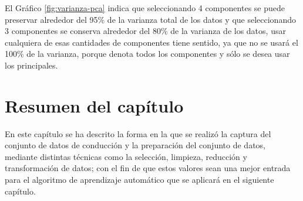 El Gr\'{a}fico \ref{fig:varianza-pca} indica que seleccionando 4 componentes se puede preservar alrededor del 95\% de la varianza total de los datos y que seleccionando 3 componentes se conserva alrededor del 80\% de la varianza de los datos, usar cualquiera de esas cantidades de componentes tiene sentido, ya que no se usar\'{a} el 100\% de la varianza, porque denota todos los componentes y s\'{o}lo se desea usar los principales.


\vspace{5mm} %

\section{Resumen del cap\'{i}tulo}

En este cap\'{i}tulo se ha descrito la forma en la que se realiz\'{o} la captura del conjunto de datos de conducci\'{o}n y la preparaci\'{o}n del conjunto de datos, mediante distintas t\'{e}cnicas como la selecci\'{o}n, limpieza, reducci\'{o}n y transformaci\'{o}n de datos; con el fin de que estos valores sean una mejor entrada para el algoritmo de aprendizaje autom\'{a}tico que se aplicar\'{a} en el siguiente cap\'{i}tulo.
